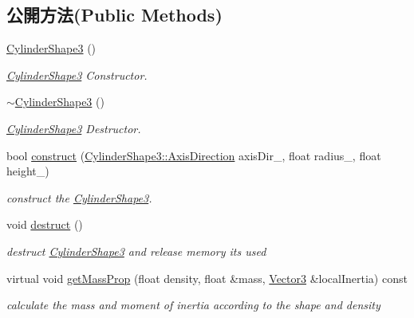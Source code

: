\subsection*{公開方法(Public Methods)}
\begin{DoxyCompactItemize}
\item 
\hyperlink{class_magnum_1_1_cylinder_shape3_a32c651f4bb77e70ddf6c2728b1b84bd8}{Cylinder\+Shape3} ()
\begin{DoxyCompactList}\small\item\em \hyperlink{class_magnum_1_1_cylinder_shape3}{Cylinder\+Shape3} Constructor. \end{DoxyCompactList}\item 
\hyperlink{class_magnum_1_1_cylinder_shape3_a71e40d19f4a4069fdc7dba140bd661e2}{$\sim$\+Cylinder\+Shape3} ()
\begin{DoxyCompactList}\small\item\em \hyperlink{class_magnum_1_1_cylinder_shape3}{Cylinder\+Shape3} Destructor. \end{DoxyCompactList}\item 
bool \hyperlink{class_magnum_1_1_cylinder_shape3_a32cf0f886433891007464cb5ff6e4fd4}{construct} (\hyperlink{class_magnum_1_1_cylinder_shape3_a48fd2f573e5d5a4c05914dd5c2def60b}{Cylinder\+Shape3\+::\+Axis\+Direction} axis\+Dir\+\_\+, float radius\+\_\+, float height\+\_\+)
\begin{DoxyCompactList}\small\item\em construct the \hyperlink{class_magnum_1_1_cylinder_shape3}{Cylinder\+Shape3}. \end{DoxyCompactList}\item 
void \hyperlink{class_magnum_1_1_cylinder_shape3_a9166cef1017d172e8769a9d54e947660}{destruct} ()\hypertarget{class_magnum_1_1_cylinder_shape3_a9166cef1017d172e8769a9d54e947660}{}\label{class_magnum_1_1_cylinder_shape3_a9166cef1017d172e8769a9d54e947660}

\begin{DoxyCompactList}\small\item\em destruct \hyperlink{class_magnum_1_1_cylinder_shape3}{Cylinder\+Shape3} and release memory its used \end{DoxyCompactList}\item 
virtual void \hyperlink{class_magnum_1_1_cylinder_shape3_ac34f1b50e44652be4bb1752c0fe8bff9}{get\+Mass\+Prop} (float density, float \&mass, \hyperlink{class_magnum_1_1_vector3}{Vector3} \&local\+Inertia) const 
\begin{DoxyCompactList}\small\item\em calculate the mass and moment of inertia according to the shape and density \end{DoxyCompactList}\end{DoxyCompactItemize}
